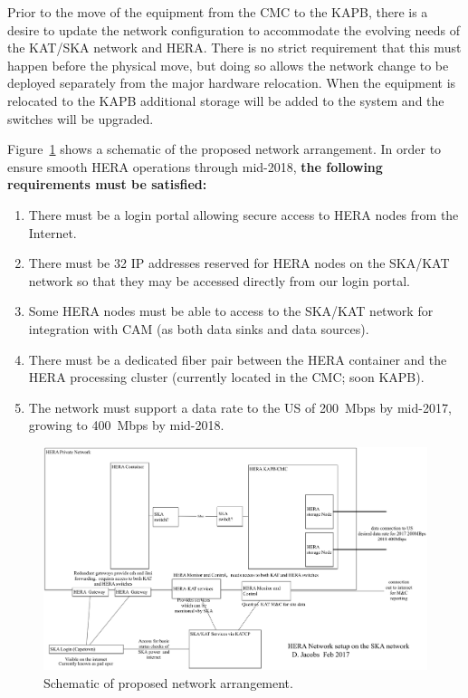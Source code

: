 \documentclass{article}
\begin{document}
Prior to the move of the equipment from the CMC to the KAPB, there is a desire
to update the network configuration to accommodate the evolving needs of the
KAT/SKA network and HERA.  There is no strict requirement that this must
happen before the physical move, but doing so allows the network change to be
deployed separately from the major hardware relocation.  When the equipment is relocated to the KAPB additional storage will be added to the system and the switches will be upgraded.

Figure~\ref{fig:net_org} shows a schematic of the proposed network arrangement. In order to ensure smooth HERA operations through mid-2018, \textbf{the following requirements must be satisfied:}
\begin{enumerate}
\item There must be a login portal allowing secure access to HERA nodes from the Internet.
\item There must be 32 IP addresses reserved for HERA nodes on the SKA/KAT network so that they may be accessed directly from our login portal.
\item Some HERA nodes must be able to access to the SKA/KAT network for integration with CAM (as both data sinks and data sources).
\item There must be a dedicated fiber pair between the HERA container and the HERA processing cluster (currently located in the CMC; soon KAPB).
\item The network must support a data rate to the US of 200~Mbps by mid-2017, growing to 400~Mbps by mid-2018.
\end{enumerate}

\begin{figure}[H]
\includegraphics[width=\textwidth]{HERA_2017_network_organization.png}
\centering
\caption{Schematic of proposed network arrangement.}
\label{fig:net_org}
\end{figure}
\end{document}
